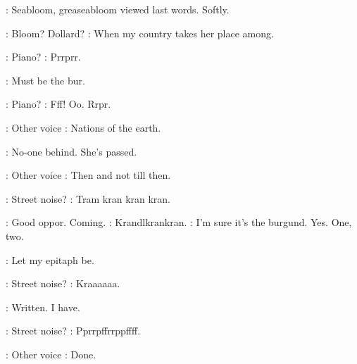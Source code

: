 :
Seabloom, greaseabloom viewed last words. Softly.

\Stage:
Bloom? Dollard?
\Song:
When my country takes her place among.

\Stage:
Piano?
:
Prrprr.

\BloomInt:
Must be the bur.

\Stage:
Piano?
:
Fff! Oo. Rrpr.

\Stage:
Other voice
\Song:
Nations of the earth.

\BloomInt:
No-one behind. She's passed.

\Stage:
Other voice
\Song:
Then and not till then.

\Stage:
Street noise?
:
Tram kran kran kran.

\BloomInt:
Good oppor. Coming.
:
Krandlkrankran.
\BloomInt:
I'm sure it's the burgund. Yes. One, two.

\Song:
Let my epitaph be.

\Stage:
Street noise?
:
Kraaaaaa.

\Song:
Written. I have.

\Stage:
Street noise?
:
Pprrpffrrppffff.

\Stage:
Other voice
\Song:
Done.
